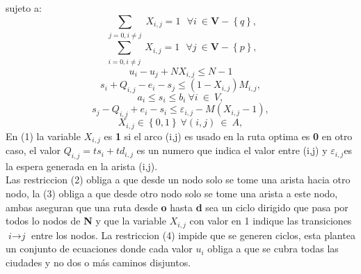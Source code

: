 \documentclass[journal, a4paper]{IEEEtran}
\begin{document}
sujeto a:
\begin{equation} 
\sum_{\substack{j=0,i\neq j}} X_{i,j} = 1 \> \> \> 
\forall i \> \in \textbf{V} - \left \{ q \right \},
\end{equation}
\begin{equation} 
\sum_{\substack{i=0,i\neq j}} X_{i,j} = 1 \> \> \>
\forall j \> \in \textbf{V} - \left \{ p \right \},
\end{equation}
\begin{equation} 
u_{i}-u_{j}+NX_{i,j} \leq N-1
\end{equation}
\begin{equation} 
s_{i} + Q_{i,j} -e_{i} - s_{j} \leq \left ( 1 - X_{i,j} \right ) M_{i,j},
\end{equation}
\begin{equation} 
a_{i}\leq s_{i} \leq b_{i} \> \forall i \> \in \> V,
\end{equation}
\begin{equation} 
s_{j} - Q_{i,j} + e_{i} - s_{i}  \leq \varepsilon _{i,j} - M (X_{i,j} - 1),
\end{equation}
\begin{equation} 
X_{i,j} \in \left \{ 0,1 \right \} \> \forall (i,j) \> \in \> A,
\end{equation}
En  (1) la variable \(X_{i,j}\)  es \textbf{1} si el arco (i,j) es usado en la ruta optima  
es \textbf{0} en otro caso, el valor \(  Q_{i,j} = ts_{i}+ td_{i,j} \)  es un numero 
que indica el valor entre (i,j) y \( \varepsilon _{i,j} \)es la espera generada en la arista (i,j).\\
Las restriccion (2) obliga a que desde un nodo solo se tome una arista hacia otro nodo,
la (3) obliga a que desde otro nodo solo se tome una arista a este nodo,
ambas aseguran que una ruta desde \textbf{o} hasta \textbf{d} sea un ciclo dirigido que 
pasa por todos lo nodos de \textbf{N} y que la variable \(X_{i,j}\)
con valor en 1 indique las transiciones  \(\textit{i} \to \textit{j}\) entre los nodos. 
La restriccion (4) impide que se generen ciclos, esta plantea un conjunto de ecuaciones donde cada valor
\( u_{i} \) obliga a que se cubra todas las ciudades y no dos o más caminos disjuntos.
\end{document}
